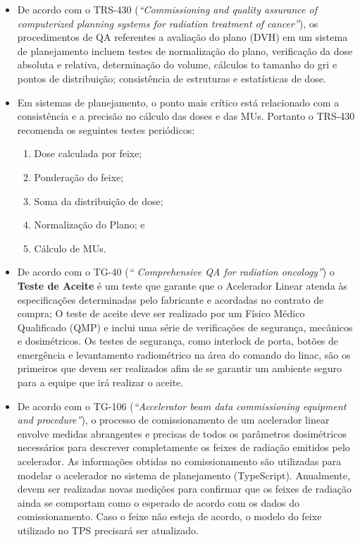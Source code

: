 \documentclass[11pt,a4paper]{article}
\newcounter{exemplo}
\begin{document}
\begin{exemplo}[11. Qualidade ]
\begin{itemize}
        \item De acordo com o TRS-430 (\textit{``Commissioning and quality assurance of computerized planning systems for radiation treatment of cancer''}), os procedimentos de QA referentes a avaliação do plano (DVH) em um sistema de planejamento incluem testes de normalização do plano, verificação da dose absoluta e relativa, determinação do volume, cálculos to tamanho do gri e pontos de distribuição; consistência de estruturas e estatísticas de dose.
        
        \item Em sistemas de planejamento, o ponto mais crítico está relacionado com a consistência e a precisão no cálculo das doses e das MUs. Portanto o TRS-430 recomenda os seguintes testes periódicos: 
            \begin{enumerate}[label=\textcolor{CarnationPink}{\roman*.}]
                \item Dose calculada por feixe;
                \item Ponderação do feixe;
                \item Soma da distribuição de dose; 
                \item Normalização do Plano; e
                \item Cálculo de MUs.
            \end{enumerate}

        \item De acordo com o TG-40 (\textit{`` Comprehensive QA for radiation oncology''}) o \textbf{Teste de Aceite} é um teste que garante que o Acelerador Linear atenda às especificações determinadas pelo fabricante e acordadas no contrato de compra; O teste de aceite deve ser realizado por um Físico Médico Qualificado (QMP) e inclui uma série de verificações de segurança, mecânicos e dosimétricos. Os testes de segurança, como interlock de porta, botões de emergência e levantamento radiométrico na área do comando do linac, são os primeiros que devem ser realizados afim de se garantir um ambiente seguro para a equipe que irá realizar o aceite.
        
        \item De acordo com o TG-106 (\textit{``Accelerator beam data commissioning equipment and procedure''}), o processo de comissionamento de um acelerador linear envolve medidas abrangentes e precisas de todos os parâmetros dosimétricos necessários para descrever completamente os feixes de radiação emitidos pelo acelerador. As informações obtidas no comissionamento são utilizadas para modelar o acelerador no sistema de planejamento (TypeScript). Anualmente, devem ser realizadas novas medições para confirmar que os feixes de radiação ainda se comportam como o esperado de acordo com os dados do comissionamento. Caso o feixe não esteja de acordo, o modelo do feixe utilizado no TPS precisará ser atualizado.
                

\end{itemize}
\end{exemplo}
\end{document}
